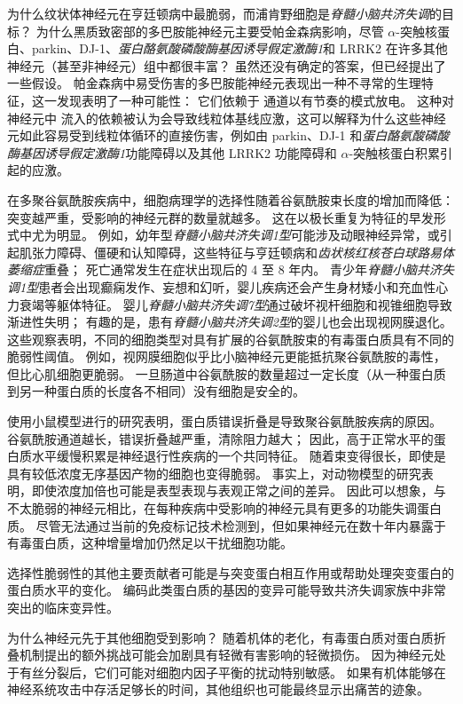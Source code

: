 为什么纹状体神经元在亨廷顿病中最脆弱，而浦肯野细胞是\textit{脊髓小脑共济失调}的目标？
为什么黑质致密部的多巴胺能神经元主要受帕金森病影响，尽管 $\alpha$-突触核蛋白、parkin、DJ-1、\textit{蛋白酪氨酸磷酸酶基因诱导假定激酶1}和 LRRK2 在许多其他神经元（甚至非神经元）组中都很丰富？
虽然还没有确定的答案，但已经提出了一些假设。
帕金森病中易受伤害的多巴胺能神经元表现出一种不寻常的生理特征，这一发现表明了一种可能性：
它们依赖于  通道以有节奏的模式放电。
这种对神经元中  流入的依赖被认为会导致线粒体基线应激，这可以解释为什么这些神经元如此容易受到线粒体循环的直接伤害，例如由 parkin、DJ-1 和\textit{蛋白酪氨酸磷酸酶基因诱导假定激酶1}功能障碍以及其他 LRRK2 功能障碍和 $\alpha$-突触核蛋白积累引起的应激。


在多聚谷氨酰胺疾病中，细胞病理学的选择性随着谷氨酰胺束长度的增加而降低：
突变越严重，受影响的神经元群的数量就越多。
这在以极长重复为特征的早发形式中尤为明显。
例如，幼年型\textit{脊髓小脑共济失调1型}可能涉及动眼神经异常，或引起肌张力障碍、僵硬和认知障碍，这些特征与亨廷顿病和\textit{齿状核红核苍白球路易体萎缩症}重叠；
死亡通常发生在症状出现后的 4 至 8 年内。
青少年\textit{脊髓小脑共济失调1型}患者会出现癫痫发作、妄想和幻听，婴儿疾病还会产生身材矮小和充血性心力衰竭等躯体特征。
婴儿\textit{脊髓小脑共济失调7型}通过破坏视杆细胞和视锥细胞导致渐进性失明；
有趣的是，患有\textit{脊髓小脑共济失调2型}的婴儿也会出现视网膜退化。
这些观察表明，不同的细胞类型对具有扩展的谷氨酰胺束的有毒蛋白质具有不同的脆弱性阈值。
例如，视网膜细胞似乎比小脑神经元更能抵抗聚谷氨酰胺的毒性，但比心肌细胞更脆弱。
一旦肠道中谷氨酰胺的数量超过一定长度（从一种蛋白质到另一种蛋白质的长度各不相同）没有细胞是安全的。


使用小鼠模型进行的研究表明，蛋白质错误折叠是导致聚谷氨酰胺疾病的原因。
谷氨酰胺通道越长，错误折叠越严重，清除阻力越大；
因此，高于正常水平的蛋白质水平缓慢积累是神经退行性疾病的一个共同特征。
随着束变得很长，即使是具有较低浓度无序基因产物的细胞也变得脆弱。
事实上，对动物模型的研究表明，即使浓度加倍也可能是表型表现与表观正常之间的差异。
因此可以想象，与不太脆弱的神经元相比，在每种疾病中受影响的神经元具有更多的功能失调蛋白质。
尽管无法通过当前的免疫标记技术检测到，但如果神经元在数十年内暴露于有毒蛋白质，这种增量增加仍然足以干扰细胞功能。


选择性脆弱性的其他主要贡献者可能是与突变蛋白相互作用或帮助处理突变蛋白的蛋白质水平的变化。
编码此类蛋白质的基因的变异可能导致共济失调家族中非常突出的临床变异性。


为什么神经元先于其他细胞受到影响？
随着机体的老化，有毒蛋白质对蛋白质折叠机制提出的额外挑战可能会加剧具有轻微有害影响的轻微损伤。
因为神经元处于有丝分裂后，它们可能对细胞内因子平衡的扰动特别敏感。
如果有机体能够在神经系统攻击中存活足够长的时间，其他组织也可能最终显示出痛苦的迹象。



